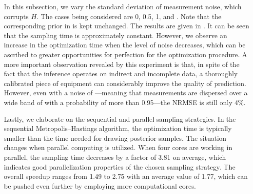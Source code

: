 
In this subsection, we vary the standard deviation of measurement noise, which
corrupts $H$. The cases being considered are 0, 0.5, 1, and 
\cite{mesa-martinez2007}. Note that the corresponding prior in
 is kept unchanged. The results are given in
. It can be seen that the sampling time is approximately
constant. However, we observe an increase in the optimization time when the
level of noise decreases, which can be ascribed to greater opportunities for
perfection for the optimization procedure. A more important observation revealed
by this experiment is that, in spite of the fact that the inference operates on
indirect and incomplete data, a thoroughly calibrated piece of equipment can
considerably improve the quality of prediction. However, even with a noise of
---meaning that measurements are dispersed over a wide band of
 with a probability of more than 0.95---the \ac{NRMSE} is still only
4\%.


Lastly, we elaborate on the sequential and parallel sampling strategies. In the
sequential Metropolis--Hastings algorithm, the optimization time is typically
smaller than the time needed for drawing posterior samples. The situation
changes when parallel computing is utilized. When four cores are working in
parallel, the sampling time decreases by a factor of 3.81 on average, which
indicates good parallelization properties of the chosen sampling strategy. The
overall speedup ranges from 1.49 to 2.75 with an average value of 1.77, which
can be pushed even further by employing more computational cores.
